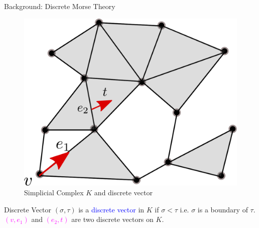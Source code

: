 \documentclass[9pt,sans-serif]{beamer}
\begin{document}
\begin{frame}{Background: Discrete Morse Theory}
 \begin{figure}[htb]
    \centering \includegraphics[scale=0.3]{vector}
    \caption{Simplicial Complex $K$ and discrete vector}
  \end{figure}

 \begin{block}{Discrete Vector}
   $(\sigma,\tau)$ is a \textcolor{blue}{discrete vector} in $K$ if
   $\sigma<\tau$ i.e. $\sigma$ is a boundary of
   $\tau$. \\ \textcolor{magenta}{$(v,e_1)$} and \textcolor{magenta}{$(e_2, t)$}
   are two discrete vectors on $K$.
 \end{block}
\end{frame}
\end{document}
